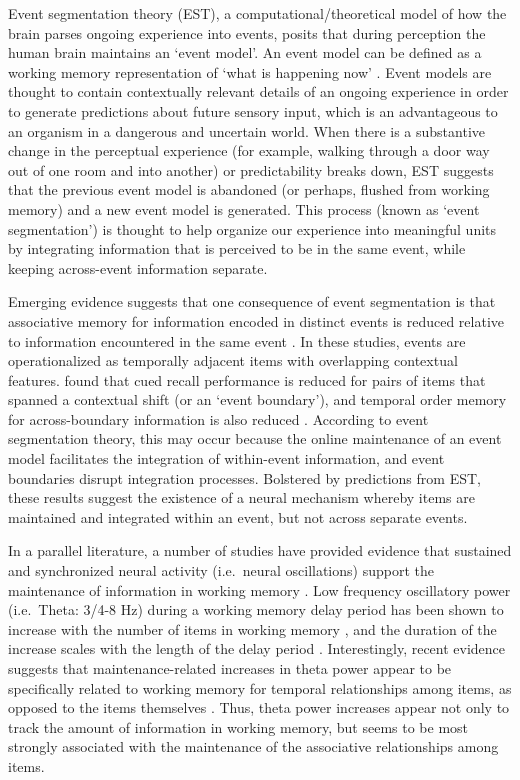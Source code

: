 Event segmentation theory (EST), a computational/theoretical model of
how the brain parses ongoing experience into events, posits that during
perception the human brain maintains an `event model'. An event model
can be defined as a working memory representation of `what is happening
now' \autocite{kurby_segmentation_2008}. Event models are thought to
contain contextually relevant details of an ongoing experience in order
to generate predictions about future sensory input, which is an
advantageous to an organism in a dangerous and uncertain world. When
there is a substantive change in the perceptual experience (for example,
walking through a door way out of one room and into another) or
predictability breaks down, EST suggests that the previous event model
is abandoned (or perhaps, flushed from working memory) and a new event
model is generated. This process (known as `event segmentation') is
thought to help organize our experience into meaningful units by
integrating information that is perceived to be in the same event, while
keeping across-event information separate.

Emerging evidence suggests that one consequence of event segmentation is
that associative memory for information encoded in distinct events is
reduced relative to information encountered in the same event
\autocites{ezzyat_what_2011}{dubrow_influence_2013}. In these studies,
events are operationalized as temporally adjacent items with overlapping
contextual features. \textcite{ezzyat_what_2011} found that cued recall
performance is reduced for pairs of items that spanned a contextual
shift (or an `event boundary'), and temporal order memory for
across-boundary information is also reduced
\autocite{dubrow_influence_2013}. According to event segmentation
theory, this may occur because the online maintenance of an event model
facilitates the integration of within-event information, and event
boundaries disrupt integration processes. Bolstered by predictions from
EST, these results suggest the existence of a neural mechanism whereby
items are maintained and integrated within an event, but not across
separate events.

In a parallel literature, a number of studies have provided evidence
that sustained and synchronized neural activity (i.e.~neural
oscillations) support the maintenance of information in working memory
\autocites{jensen_frontal_2002}{raghavachari_gating_2001}{hsieh_neural_2011}.
Low frequency oscillatory power (i.e.~Theta: 3/4-8 Hz) during a working
memory delay period has been shown to increase with the number of items
in working memory
\autocites{jensen_frontal_2002}{scheeringa_trial-by-trial_2009}{gevins_high-resolution_1997}{raghavachari_theta_2006},
and the duration of the increase scales with the length of the delay
period \autocite{raghavachari_gating_2001}. Interestingly, recent
evidence suggests that maintenance-related increases in theta power
appear to be specifically related to working memory for temporal
relationships among items, as opposed to the items themselves
\autocite{hsieh_neural_2011}. Thus, theta power increases appear not
only to track the amount of information in working memory, but seems to
be most strongly associated with the maintenance of the associative
relationships among items.

